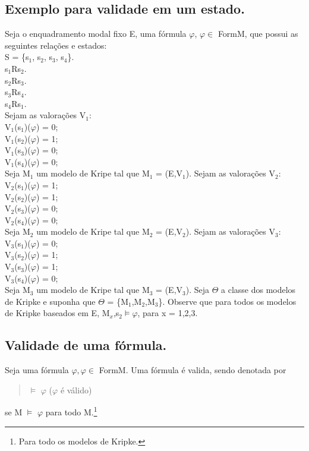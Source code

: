 \documentclass[12pt]{report}
\begin{document}
 \subsection{Exemplo para validade em um estado.}%
 \hspace{0.5cm} Seja o enquadramento modal fixo E, uma fórmula $\varphi$, $\varphi \in $ FormM, que possui as seguintes relações e estados:\\
 S = \{s$_{1}$, s$_{2}$, s$_{3}$, s$_{4}$\}.\\
 s$_{1}$Rs$_{2}$.\\
 s$_{2}$Rs$_{3}$.\\
 s$_{3}$Rs$_{4}$.\\
 s$_{4}$Rs$_{1}$.\\
 Sejam as valorações V$_{1}$:\\
 V$_{1}$(s$_{1}$)($\varphi$) = 0;\\
 V$_{1}$(s$_{2}$)($\varphi$) = 1;\\
 V$_{1}$(s$_{3}$)($\varphi$) = 0;\\
 V$_{1}$(s$_{4}$)($\varphi$) = 0;\\
 Seja M$_{1}$ um modelo de Kripe tal que M$_{1}$ = (E,V$_{1}$). Sejam as valorações V$_{2}$:\\
 V$_{2}$(s$_{1}$)($\varphi$) = 1;\\
 V$_{2}$(s$_{2}$)($\varphi$) = 1;\\
 V$_{2}$(s$_{3}$)($\varphi$) = 0;\\
 V$_{2}$(s$_{4}$)($\varphi$) = 0;\\
 Seja M$_{2}$ um modelo de Kripe tal que M$_{2}$ = (E,V$_{2}$). Sejam as valorações V$_{3}$:\\
 V$_{3}$(s$_{1}$)($\varphi$) = 0;\\
 V$_{3}$(s$_{2}$)($\varphi$) = 1;\\
 V$_{3}$(s$_{3}$)($\varphi$) = 1;\\
 V$_{3}$(s$_{4}$)($\varphi$) = 0;\\
 Seja M$_{3}$ um modelo de Kripe tal que M$_{3}$ = (E,V$_{3}$). Seja $\Theta$ a classe dos modelos de Kripke e suponha que $ \Theta$ = \{M$_{1}$,M$_{2}$,M$_{3}$\}. Observe que para todos os modelos de Kripke baseados em E, M$_{x}$,s$_{2} \models \varphi$, para x = 1,2,3.
 \subsection{Validade de uma fórmula.}%
 \hspace{0.5cm} Seja uma fórmula $\varphi, \varphi \in$ FormM. Uma fórmula é valida, sendo denotada por
 \begin{quote}
 $\vDash$ $\varphi$ ($\varphi$ é válido) 
 \end{quote}
 se M $\vDash$ $\varphi$ para todo M.\footnote{Para todo os modelos de Kripke.}\\ 
\end{document}
